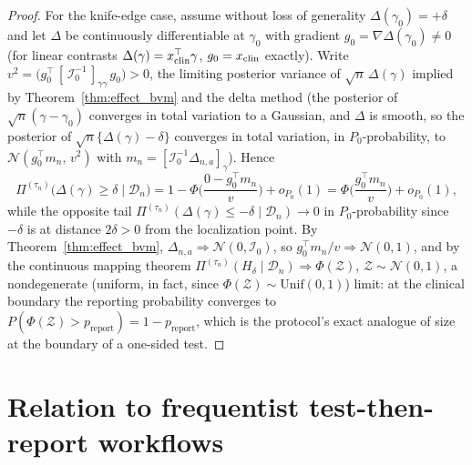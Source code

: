 \documentclass[11pt]{article}
\theoremstyle{definition}
\theoremstyle{plain}
\begin{document}
\begin{proof}
For the knife-edge case, assume without loss of generality $\Delta(\gamma_0)=+\delta$ and let $\Delta$ be continuously differentiable at $\gamma_0$ with gradient $g_0=\nabla\Delta(\gamma_0)\ne0$ (for linear contrasts $\Delta(\gamma)=x_{\rm clin}^\top\gamma$, $g_0=x_{\rm clin}$ exactly). Write $v^2=\big(g_0^\top\,[\,\mathcal I_0^{-1}\,]_{\gamma\gamma}\,g_0\big)>0$, the limiting posterior variance of $\sqrt n\,\Delta(\gamma)$ implied by Theorem~\ref{thm:effect_bvm} and the delta method (the posterior of $\sqrt n(\gamma-\gamma_0)$ converges in total variation to a Gaussian, and $\Delta$ is smooth, so the posterior of $\sqrt n\{\Delta(\gamma)-\delta\}$ converges in total variation, in $P_0$-probability, to $\mathcal N(g_0^\top m_n,\,v^2)$ with $m_n=[\mathcal I_0^{-1}\Delta_{n,a}]_\gamma$). Hence
\[
\Pi^{(\tau_n)}\big(\Delta(\gamma)\ge\delta\mid\mathcal D_n\big)
=1-\Phi\Big(\frac{0-g_0^\top m_n}{v}\Big)+o_{P_0}(1)
=\Phi\Big(\frac{g_0^\top m_n}{v}\Big)+o_{P_0}(1),
\]
while the opposite tail $\Pi^{(\tau_n)}(\Delta(\gamma)\le-\delta\mid\mathcal D_n)\to0$ in $P_0$-probability since $-\delta$ is at distance $2\delta>0$ from the localization point. By Theorem~\ref{thm:effect_bvm}, $\Delta_{n,a}\Rightarrow\mathcal N(0,\mathcal I_0)$, so $g_0^\top m_n/v\Rightarrow\mathcal N(0,1)$, and by the continuous mapping theorem
$\Pi^{(\tau_n)}(H_\delta\mid\mathcal D_n)\Rightarrow\Phi(\mathcal Z)$, $\mathcal Z\sim\mathcal N(0,1)$,
a nondegenerate (uniform, in fact, since $\Phi(\mathcal Z)\sim\mathrm{Unif}(0,1)$) limit: at the clinical boundary the reporting probability converges to $P(\Phi(\mathcal Z)>p_{\mathrm{report}})=1-p_{\mathrm{report}}$, which is the protocol's exact analogue of size at the boundary of a one-sided test.
\end{proof}

\section{Relation to frequentist test-then-report workflows}
\label{sec:frequentist_comparison}
\end{document}
